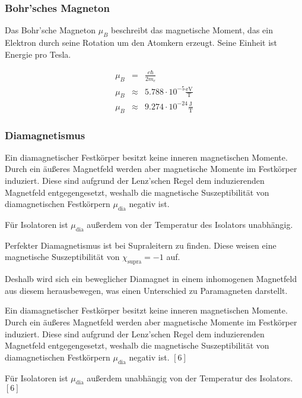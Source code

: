 \documentclass[12pt,a4paper]{scrartcl}
\numberwithin{equation}{section} %
\newcommand{\pu}[1]{\ensuremath{\mathrm{#1}}}
\renewcommand{\[}{} %
\renewcommand{\]}{\noindent} %
\begin{document}
\hypertarget{bohrsches-magneton}{%
\subsubsection{Bohr'sches Magneton}\label{bohrsches-magneton}}

Das Bohr'sche Magneton \(\mu_B\) beschreibt das magnetische Moment, das
ein Elektron durch seine Rotation um den Atomkern erzeugt. Seine Einheit
ist Energie pro Tesla.

\[
\begin{eqnarray}
    \mu_B &=& \frac{e\hbar}{2m_e} \\
    \mu_B &\approx& \pu{5.788 \cdot 10^{-5} \frac{eV}{T}} \\
    \mu_B &\approx& \pu{9.274 \cdot 10^{-24} \frac{J}{T}}
\end{eqnarray}
\]

\hypertarget{diamagnetismus}{%
\subsubsection{Diamagnetismus}\label{diamagnetismus}}

Ein diamagnetischer Festkörper besitzt keine inneren magnetischen
Momente. Durch ein äußeres Magnetfeld werden aber magnetische Momente im
Festkörper induziert. Diese sind aufgrund der Lenz'schen Regel dem
induzierenden Magnetfeld entgegengesetzt, weshalb die magnetische
Suszeptibilität von diamagnetischen Festkörpern \(\mu_\mathrm{dia}\)
negativ ist.

Für Isolatoren ist \(\mu_\mathrm{dia}\) außerdem von der Temperatur des
Isolators unabhängig.

Perfekter Diamagnetismus ist bei Supraleitern zu finden. Diese weisen
eine magnetische Suszeptibilität von \(\chi_\mathrm{supra} = -1\) auf.

Deshalb wird sich ein beweglicher Diamagnet in einem inhomogenen
Magnetfeld aus diesem herausbewegen, was einen Unterschied zu
Paramagneten darstellt.

Ein diamagnetischer Festkörper besitzt keine inneren magnetischen
Momente. Durch ein äußeres Magnetfeld werden aber magnetische Momente im
Festkörper induziert. Diese sind aufgrund der Lenz'schen Regel dem
induzierenden Magnetfeld entgegengesetzt, weshalb die magnetische
Suszeptibilität von diamagnetischen Festkörpern \(\mu_\mathrm{dia}\)
negativ ist. \([6]\)

Für Isolatoren ist \(\mu_\mathrm{dia}\) außerdem unabhängig von der
Temperatur des Isolators. \([6]\)
\end{document}
